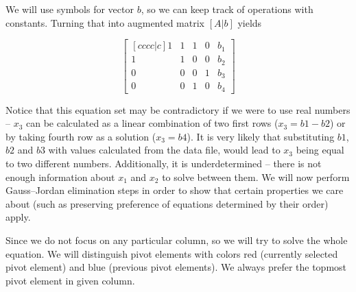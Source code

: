 We will use symbols for vector \textbf{$b$}, so we can keep track of operations with constants.
Turning that into augmented matrix $[A|b]$ yields

\begin{equation}
\begin{bmatrix}[cccc|c]
    1 & 1 & 1 & 0 & b_1 \\ 
    1 & 1 & 0 & 0 & b_2 \\ 
    0 & 0 & 0 & 1 & b_3 \\ 
    0 & 0 & 1 & 0 & b_4
\end{bmatrix}
\end{equation}

Notice that this equation set may be contradictory if we were to use real numbers -- $x_3$ can be calculated as a linear combination of two first rows ($x_3 = b1 - b2$) or by taking fourth row as a solution ($x_3 = b4$).
It is very likely that substituting $b1$, $b2$ and $b3$ with values calculated from the data file, would lead to $x_3$ being equal to two different numbers.
Additionally, it is underdetermined -- there is not enough information about $x_1$ and $x_2$ to solve between them.
We will now perform Gauss--Jordan elimination steps in order to show that certain properties we care about (such as preserving preference of equations determined by their order) apply.

Since we do not focus on any particular column, so we will try to solve the whole equation.
We will distinguish pivot elements with colors red (currently selected pivot element) and blue (previous pivot elements).
We always prefer the topmost pivot element in given column.

